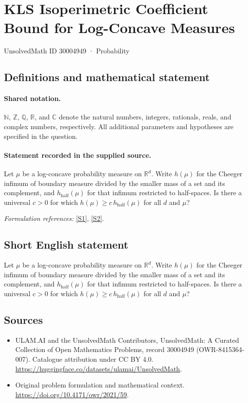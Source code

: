\documentclass[11pt]{article}
\newcommand{\sref}[2]{\hyperlink{source:#1:#2}{[S#2]}}
\begin{document}
\setcounter{section}{30004948}
\section{KLS Isoperimetric Coefficient Bound for Log-Concave Measures}\label{30004949}
{\small UnsolvedMath ID 30004949 · Probability}
\subsection{Definitions and mathematical statement}

\paragraph{Shared notation.}$\mathbb N$, $\mathbb Z$, $\mathbb Q$, $\mathbb R$, and $\mathbb C$ denote the natural numbers, integers, rationals, reals, and complex numbers, respectively. All additional parameters and hypotheses are specified in the question.


\paragraph{Statement recorded in the supplied source.}
Let $\mu$ be a log-concave probability measure on $\mathbb R^d$. Write $h(\mu)$ for the Cheeger infimum of boundary measure divided by the smaller mass of a set and its complement, and $h_{\mathrm{half}}(\mu)$ for that infimum restricted to half-spaces. Is there a universal $c>0$ for which $h(\mu)\geq c\,h_{\mathrm{half}}(\mu)$ for all $d$ and $\mu$?
\par\smallskip\textit{Formulation references:} \sref{30004949}{1}, \sref{30004949}{2}.
\subsection{Short English statement}
Let $\mu$ be a log-concave probability measure on $\mathbb R^d$. Write $h(\mu)$ for the Cheeger infimum of boundary measure divided by the smaller mass of a set and its complement, and $h_{\mathrm{half}}(\mu)$ for that infimum restricted to half-spaces. Is there a universal $c>0$ for which $h(\mu)\geq c\,h_{\mathrm{half}}(\mu)$ for all $d$ and $\mu$?
\subsection{Sources}
\begin{itemize}
\item[\hypertarget{source:30004949:1}{S1}] ULAM.AI and the UnsolvedMath Contributors, UnsolvedMath: A Curated Collection of Open Mathematics Problems, record 30004949 (OWR-8415364-007). Catalogue attribution under CC BY 4.0.
\url{https://huggingface.co/datasets/ulamai/UnsolvedMath}.
\item[\hypertarget{source:30004949:2}{S2}] Original problem formulation and mathematical context.
\url{https://doi.org/10.4171/owr/2021/59}.
\end{itemize}
\label{end:30004949}
\end{document}
